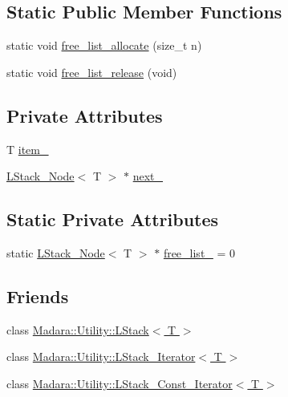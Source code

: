 \subsection*{Static Public Member Functions}
\begin{DoxyCompactItemize}
\item 
static void \hyperlink{classMadara_1_1Utility_1_1LStack__Node_a046823c818296a7b9bbf90e188107820}{free\_\-list\_\-allocate} (size\_\-t n)
\item 
static void \hyperlink{classMadara_1_1Utility_1_1LStack__Node_a7bb19525e1b719926b5f90654565226f}{free\_\-list\_\-release} (void)
\end{DoxyCompactItemize}
\subsection*{Private Attributes}
\begin{DoxyCompactItemize}
\item 
T \hyperlink{classMadara_1_1Utility_1_1LStack__Node_a6dffb8891f062c524b4363aa0e6b2d36}{item\_\-}
\item 
\hyperlink{classMadara_1_1Utility_1_1LStack__Node}{LStack\_\-Node}$<$ T $>$ $\ast$ \hyperlink{classMadara_1_1Utility_1_1LStack__Node_a37a81a0b974d4b5858c1c3bcb08af2a6}{next\_\-}
\end{DoxyCompactItemize}
\subsection*{Static Private Attributes}
\begin{DoxyCompactItemize}
\item 
static \hyperlink{classMadara_1_1Utility_1_1LStack__Node}{LStack\_\-Node}$<$ T $>$ $\ast$ \hyperlink{classMadara_1_1Utility_1_1LStack__Node_ac2f0730e3d28efafff13160afb75380a}{free\_\-list\_\-} = 0
\end{DoxyCompactItemize}
\subsection*{Friends}
\begin{DoxyCompactItemize}
\item 
class \hyperlink{classMadara_1_1Utility_1_1LStack__Node_a4cffa56a478d73c4dcfe8a9434715445}{Madara::Utility::LStack$<$ T $>$}
\item 
class \hyperlink{classMadara_1_1Utility_1_1LStack__Node_a0e9bb5bae8c0a301fea3930d9a7781cb}{Madara::Utility::LStack\_\-Iterator$<$ T $>$}
\item 
class \hyperlink{classMadara_1_1Utility_1_1LStack__Node_a97cc03b0fc610138ec28c8239d153cf8}{Madara::Utility::LStack\_\-Const\_\-Iterator$<$ T $>$}
\end{DoxyCompactItemize}


